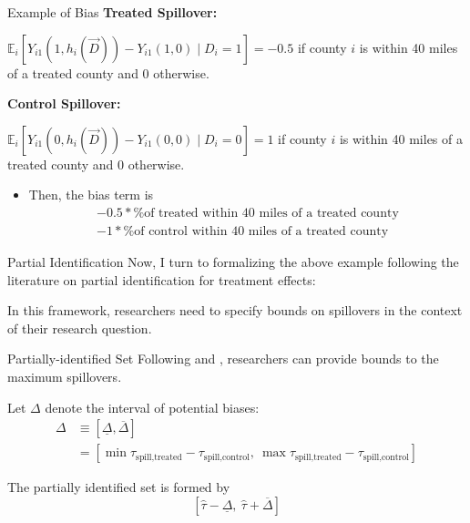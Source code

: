\documentclass[aspectratio=43]{beamer}
\begin{document}
\begin{frame}{Example of Bias}
    \textbf{Treated Spillover:}
    
    $\mathbb{E}_i \left[ Y_{i1}(1, h_i(\vec{D})) - Y_{i1}(1, 0) \mid D_i = 1 \right] = -0.5$ if county $i$ is within 40 miles of a treated county and $0$ otherwise.
        
    \textbf{Control Spillover:}
    
    $\mathbb{E}_i \left[ Y_{i1}(0, h_i(\vec{D})) - Y_{i1}(0, 0) \mid D_i = 0 \right] = 1$ if county $i$ is within 40 miles of a treated county and $0$ otherwise.
        
    \begin{itemize}
        \item Then, the bias term is \begin{align*}
            -0.5 * \text{\% of treated within 40 miles of a treated county} \\
            -1 * \text{\% of control within 40 miles of a treated county}
        \end{align*}
    \end{itemize}
\end{frame}

\begin{frame}{Partial Identification}
    Now, I turn to formalizing the above example following the literature on partial identification for treatment effects: \begin{citecolor}
    \end{citecolor}

    In this framework, researchers need to specify bounds on spillovers in the context of their research question.
\end{frame}

\begin{frame}{Partially-identified Set}
    Following \citet{Rambachan_Roth_2020} and \citet{Manski_Pepper_2018}, researchers can provide bounds to the maximum spillovers. 

    Let $\Delta$ denote the interval of potential biases: 
    \begin{align*}
        \Delta &\equiv [\underline{\Delta}, \overline{\Delta}] \\
        &= \left[ \min \tau_{\text{spill,treated}} - \tau_{\text{spill,control}}, \ \max \tau_{\text{spill,treated}} - \tau_{\text{spill,control}} \right] 
    \end{align*}

    The partially identified set is formed by \[ 
        \left[\hat{\tau} - \underline{\Delta} , \ \hat{\tau} + \overline{\Delta} \right]    
    \]

\end{frame}
\end{document}
